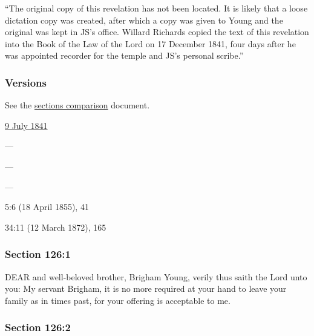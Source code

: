 			``The original copy of this revelation has not been located. It is likely that a loose dictation copy was created, after which a copy was given to Young and the original was kept in JS's office. Willard Richards copied the text of this revelation into the Book of the Law of the Lord on 17 December 1841, four days after he was appointed recorder for the temple and JS's personal scribe.''
					
	\subsubsection{Versions}
		\label{DC126-V}
		
		See the \href{https://drive.google.com/file/d/1goAvNz8jS4R8slYfMG_db55Ty2z_vmgK/view?usp=sharing}{sections comparison} document.
	
		\begin{compactdesc}
			\item[JSP] \hyperref[EMS-1841-JS-9-JUL-1841]{9 July 1841}
			\item[BC] ---
			\item[DC 1835] ---
			\item[DC 1844] ---
			\item[DN] 5:6 (18 April 1855), 41
			\item[MS] 34:11 (12 March 1872), 165
		\end{compactdesc}

	\subsubsection{Section 126:1} %
		\label{DC126-1}

		DEAR and well-beloved brother, Brigham Young, verily thus saith the Lord unto you: My servant Brigham, it is no more required at your hand to leave your family as in times past, for your offering is acceptable to me.


	\subsubsection{Section 126:2} %
		\label{DC126-2}

